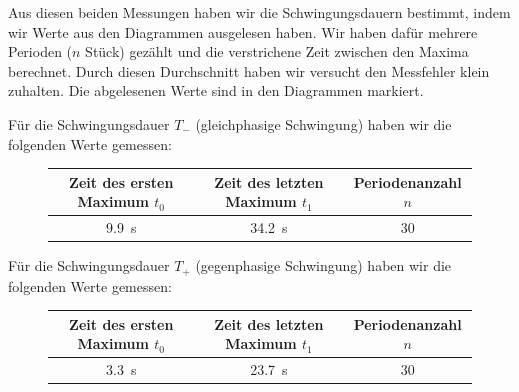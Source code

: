 \documentclass{article}
\begin{document}
              Aus diesen beiden Messungen haben wir die Schwingungsdauern bestimmt, indem wir Werte aus den Diagrammen ausgelesen haben.
              Wir haben dafür mehrere Perioden (\(n\) Stück) gezählt und die verstrichene Zeit zwischen den Maxima berechnet.
              Durch diesen Durchschnitt haben wir versucht den Messfehler klein zuhalten.
              Die abgelesenen Werte sind in den Diagrammen markiert.

              Für die Schwingungsdauer \(T_{-}\) (gleichphasige Schwingung) haben wir die folgenden Werte gemessen:
              \begin{figure}[ht]
                  \centering
                  \begin{tabular}{|c | c | c|}
                      \hline
                      Zeit des ersten Maximum \(t_0\) & Zeit des letzten Maximum \(t_1\) & Periodenanzahl \(n\) \\
                      \hline
                      \SI{9.9}{\second}               & \SI{34.2}{\second}               & 30 \\
                      \hline
                  \end{tabular}
              \end{figure}

              Für die Schwingungsdauer \(T_{+}\) (gegenphasige Schwingung) haben wir die folgenden Werte gemessen:
              \begin{figure}[ht]
                  \centering
                  \begin{tabular}{|c | c | c|}
                      \hline
                      Zeit des ersten Maximum \(t_0\) & Zeit des letzten Maximum \(t_1\) & Periodenanzahl \(n\) \\
                      \hline
                      \SI{3.3}{\second}               & \SI{23.7}{\second}               & 30 \\
                      \hline
                  \end{tabular}
              \end{figure}
\end{document}
